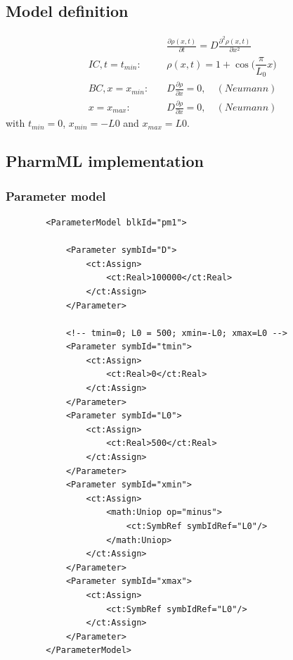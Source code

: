 \subsection*{Model definition}

\begin{align}
& \frac{\partial \rho(x,t)}{\partial t}  = D \frac{\partial^2 \rho(x,t)}{\partial x^2} \nonumber \\
IC, t=t_{min}: \quad & \rho(x,t) =  1 + \cos\Big( \dfrac{\pi}{L_0}x \Big)\nonumber \\
BC, x=x_{min}: \quad & D \frac{\partial \rho}{\partial x} = 0, \quad (Neumann) \nonumber \\
	x=x_{max}: \quad & D \frac{\partial \rho}{\partial x} = 0 , \quad (Neumann) \nonumber
\end{align}
with $t_{min}=0$, $x_{min}=-L0$ and $x_{max}=L0$.

\subsection*{PharmML implementation}

\bigskip
\subsubsection*{Parameter model}

\lstset{language=XML}
\begin{lstlisting}
        <ParameterModel blkId="pm1">
            
            <Parameter symbId="D">
                <ct:Assign>
                    <ct:Real>100000</ct:Real>
                </ct:Assign>
            </Parameter>
            
            <!-- tmin=0; L0 = 500; xmin=-L0; xmax=L0 -->
            <Parameter symbId="tmin">
                <ct:Assign>
                    <ct:Real>0</ct:Real>
                </ct:Assign>
            </Parameter>
            <Parameter symbId="L0">
                <ct:Assign>
                    <ct:Real>500</ct:Real>
                </ct:Assign>
            </Parameter>
            <Parameter symbId="xmin">
                <ct:Assign>
                    <math:Uniop op="minus">
                        <ct:SymbRef symbIdRef="L0"/>
                    </math:Uniop>
                </ct:Assign>
            </Parameter>
            <Parameter symbId="xmax">
                <ct:Assign>
                    <ct:SymbRef symbIdRef="L0"/>
                </ct:Assign>
            </Parameter>
        </ParameterModel>
\end{lstlisting}


